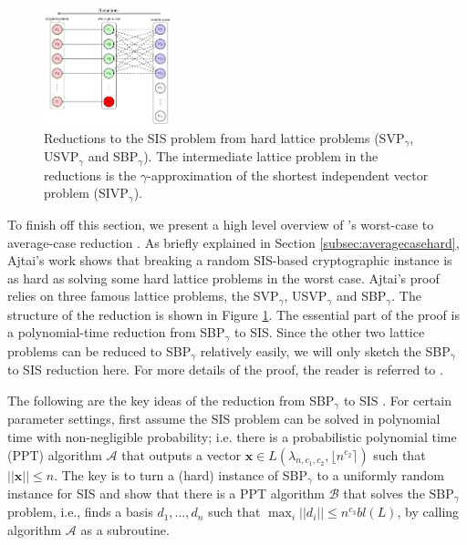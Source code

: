 \documentclass[../main.tex]{subfiles}
\begin{document}
\begin{figure}[hbt!]
    \centering
    \includegraphics[page=15,width=10em]{images/Lattice_crypto_tikz_folder.pdf}
    \caption{Reductions to the SIS problem from hard lattice problems (SVP$_{\gamma}$, USVP$_{\gamma}$ and SBP$_{\gamma}$). The intermediate lattice problem in the reductions is the $\gamma$-approximation of the shortest independent vector problem (SIVP$_\gamma$).}
    \label{fig:sisReduction}
\end{figure}
To finish off this section, we present a high level overview of \cite{ajtai1996generating}'s worst-case to average-case reduction . As briefly explained in Section \ref{subsec:averagecasehard}, Ajtai's work shows that breaking a random SIS-based cryptographic instance is as hard as solving some hard lattice problems in the worst case. %
Ajtai's proof relies on three famous lattice problems, the SVP$_{\gamma}$, USVP$_{\gamma}$ and SBP$_{\gamma}$. The structure of the reduction is shown in Figure \ref{fig:sisReduction}. The essential part of the proof is a polynomial-time reduction from SBP$_{\gamma}$ to SIS. Since the other two lattice problems can be reduced to SBP$_{\gamma}$ relatively easily, we will only sketch the SBP$_{\gamma}$ to SIS reduction here. For more details of the proof, the reader is referred to \citep{ajtai1996generating}.

The following are the key ideas of the reduction from SBP$_{\gamma}$ to SIS .
\reversemarginpar
{}
For certain parameter settings, first assume the SIS problem can be solved in polynomial time with  non-negligible probability; i.e. there is a probabilistic polynomial time (PPT) algorithm $\mathcal{A}$ that outputs a vector $\mathbf{x} \in L(\lambda_{n,c_1,c_2}, \lfloor n^{c_2}\rceil)$ such that $||\mathbf{x}||\le n$.
The key is to turn a (hard) instance of SBP$_{\gamma}$ to a uniformly random instance for SIS and show that there is a PPT algorithm $\mathcal{B}$ that solves the $\text{SBP}_{\gamma}$ problem, i.e., finds a basis $d_1, \dots, d_n$ such that $\max_i ||d_i|| \le n^{c_3}bl(L)$, by calling algorithm $\mathcal{A}$ as a subroutine.  
\end{document}
